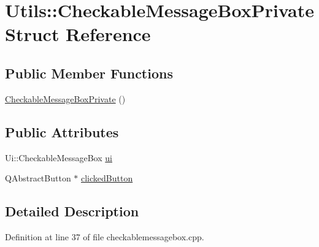 \hypertarget{struct_utils_1_1_checkable_message_box_private}{\section{\-Utils\-:\-:\-Checkable\-Message\-Box\-Private \-Struct \-Reference}
\label{struct_utils_1_1_checkable_message_box_private}
}
\subsection*{\-Public \-Member \-Functions}
\begin{DoxyCompactItemize}
\item 
\hyperlink{struct_utils_1_1_checkable_message_box_private_a023550af415e92cf97c394cca652bace}{\-Checkable\-Message\-Box\-Private} ()
\end{DoxyCompactItemize}
\subsection*{\-Public \-Attributes}
\begin{DoxyCompactItemize}
\item 
\-Ui\-::\-Checkable\-Message\-Box \hyperlink{struct_utils_1_1_checkable_message_box_private_a7775c12cc49befaa49faec030c670e1b}{ui}
\item 
\-Q\-Abstract\-Button $\ast$ \hyperlink{struct_utils_1_1_checkable_message_box_private_aceb1fbc032f66e65b09251d13e2bb874}{clicked\-Button}
\end{DoxyCompactItemize}


\subsection{\-Detailed \-Description}


\-Definition at line 37 of file checkablemessagebox.\-cpp.



